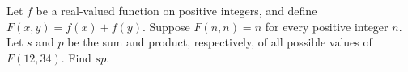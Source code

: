 Let $f$ be a real-valued function on positive integers, and define $F(x,y)=f(x)+f(y)$. Suppose $F(n,n)=n$ for every positive integer $n$. Let $s$ and $p$ be the sum and product, respectively, of all possible values of $F(12,34)$. Find $sp$.

